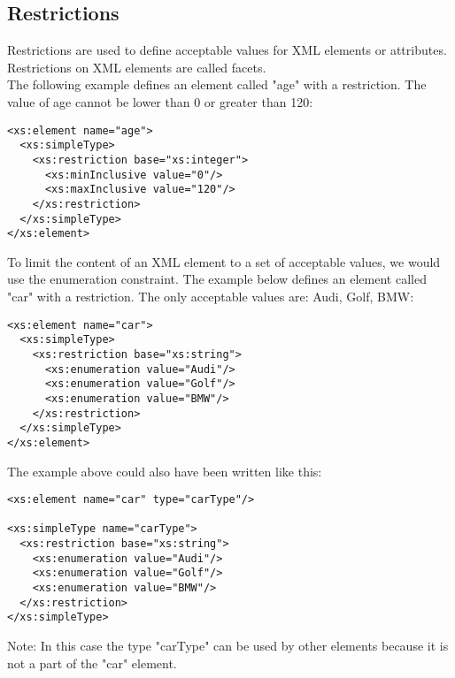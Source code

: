 \documentclass[11pt]{article}
\begin{document}
\subsection{Restrictions}
\label{sec:orgc1c8a9c}
Restrictions are used to define acceptable values for XML elements or attributes. Restrictions on XML elements are called facets.\\
The following example defines an element called "age" with a restriction. The value of age cannot be lower than 0 or greater than 120:
\lstset{breaklines=true,language=XML,label= ,caption= ,captionpos=b,numbers=none}
\begin{lstlisting}
<xs:element name="age">
  <xs:simpleType>
    <xs:restriction base="xs:integer">
      <xs:minInclusive value="0"/>
      <xs:maxInclusive value="120"/>
    </xs:restriction>
  </xs:simpleType>
</xs:element>
\end{lstlisting}
To limit the content of an XML element to a set of acceptable values, we would use the enumeration constraint.
The example below defines an element called "car" with a restriction. The only acceptable values are: Audi, Golf, BMW:
\lstset{breaklines=true,language=XML,label= ,caption= ,captionpos=b,numbers=none}
\begin{lstlisting}
<xs:element name="car">
  <xs:simpleType>
    <xs:restriction base="xs:string">
      <xs:enumeration value="Audi"/>
      <xs:enumeration value="Golf"/>
      <xs:enumeration value="BMW"/>
    </xs:restriction>
  </xs:simpleType>
</xs:element>
\end{lstlisting}
The example above could also have been written like this:
\lstset{breaklines=true,language=XML,label= ,caption= ,captionpos=b,numbers=none}
\begin{lstlisting}
<xs:element name="car" type="carType"/>

<xs:simpleType name="carType">
  <xs:restriction base="xs:string">
    <xs:enumeration value="Audi"/>
    <xs:enumeration value="Golf"/>
    <xs:enumeration value="BMW"/>
  </xs:restriction>
</xs:simpleType>
\end{lstlisting}
Note: In this case the type "carType" can be used by other elements because it is not a part of the "car" element.
\end{document}
